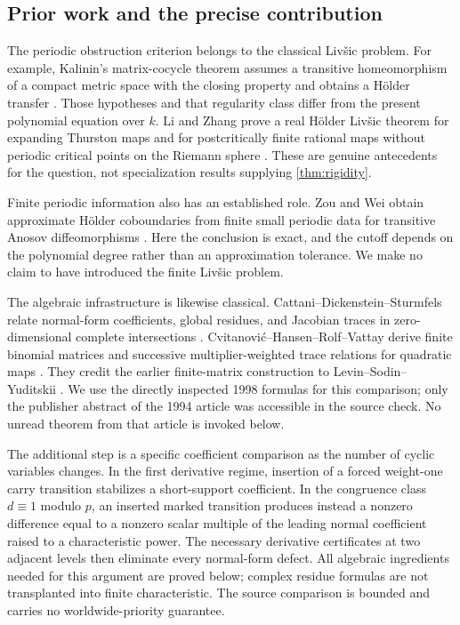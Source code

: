 \subsection{Prior work and the precise contribution}

The periodic obstruction criterion belongs to the classical
Liv\v{s}ic problem. For example, Kalinin's matrix-cocycle theorem
assumes a transitive homeomorphism of a compact metric space with
the closing property and obtains a H\"older transfer
\cite[Theorem~1.1]{kalinin2011livsic}. Those hypotheses and that
regularity class differ from the present polynomial equation over
$k$. Li and Zhang prove a real H\"older Liv\v{s}ic theorem for
expanding Thurston maps and for postcritically finite rational maps
without periodic critical points on the Riemann sphere
\cite[Theorem~1.1]{li2025ground}. These are genuine antecedents for
the question, not specialization results supplying \cref{thm:rigidity}.

Finite periodic information also has an established role. Zou and
Wei obtain approximate H\"older coboundaries from finite small
periodic data for transitive Anosov diffeomorphisms
\cite[Theorem~1.1]{zou2025finite}. Here the conclusion is exact,
and the cutoff depends on the polynomial degree rather than an
approximation tolerance. We make no claim to have introduced the
finite Liv\v{s}ic problem.

The algebraic infrastructure is likewise classical.
Cattani--Dickenstein--Sturmfels relate normal-form coefficients,
global residues, and Jacobian traces in zero-dimensional complete
intersections \cite[Section~4 of the accessible preprint]{cattani1996residues}.
Cvitanovi\'c--Hansen--Rolf--Vattay derive finite binomial matrices
and successive multiplier-weighted trace relations for quadratic
maps \cite[Section~4]{cvitanovic1998beyond}. They credit the earlier
finite-matrix construction to Levin--Sodin--Yuditskii
\cite{levin1994ruelle}. We use the directly inspected 1998 formulas
for this comparison; only the publisher abstract of the 1994
article was accessible in the source check. No unread theorem
from that article is invoked below.

The additional step is a specific coefficient comparison as the
number of cyclic variables changes. In the first derivative regime,
insertion of a forced weight-one carry transition stabilizes a
short-support coefficient. In the congruence class $d\equiv1$
modulo $p$, an inserted marked transition produces instead a
nonzero difference equal to a nonzero scalar multiple of the leading
normal coefficient raised to a characteristic power. The necessary derivative certificates
at two adjacent levels then eliminate every normal-form defect.
All algebraic ingredients needed for this argument are proved
below; complex residue formulas are not transplanted into finite
characteristic. The source comparison is bounded and carries no
worldwide-priority guarantee.

